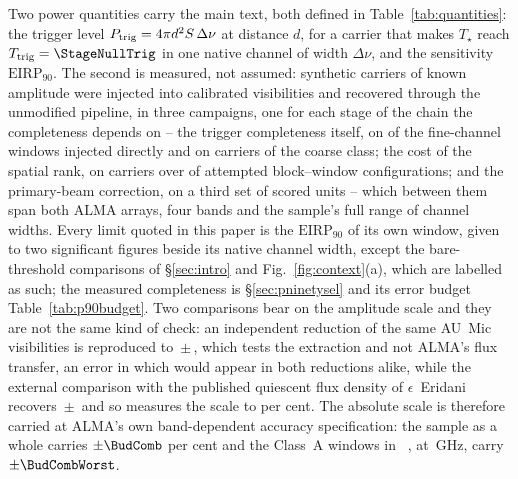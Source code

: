Two power quantities carry the main text, both defined in
Table~\ref{tab:quantities}: the trigger level $P_{\rm trig} = 4\pi
d^{2}S\,\Delta\nu$ at distance $d$, for a carrier that makes $T_\star$ reach
$T_{\rm trig}=\StageNullTrig$ in one native channel of width $\Delta\nu$, and
the sensitivity $\mathrm{EIRP}_{90}$. The second is measured, not assumed:
synthetic carriers of known amplitude were injected into calibrated
visibilities and recovered through the unmodified pipeline, in three campaigns,
one for each stage of the chain the completeness depends on -- the trigger
completeness itself, on \MkInjCompWin{} of the \MkInjCompDenom{} fine-channel
windows injected directly and on \SensNToneCoarse{} carriers of the coarse
class; the cost of the spatial rank, on \SelNTone{} carriers over
\MkInjSelUnit{} of \MkInjSelTotal{} attempted block--window configurations; and
the primary-beam correction, on a third set of \MkInjBeamUnit{} scored units --
which between them span both ALMA arrays, four bands and the sample's full
range of channel widths. Every limit quoted in this paper is the
$\mathrm{EIRP}_{90}$ of its own window, given to two significant figures beside
its native channel width, except the bare-threshold comparisons of
\S\ref{sec:intro} and Fig.~\ref{fig:context}(a), which are labelled as such;
the measured completeness is \S\ref{sec:pninetysel} and its error budget
Table~\ref{tab:p90budget}. Two comparisons bear on the amplitude scale and they
are not the same kind of check: an independent reduction of the same AU~Mic
visibilities is reproduced to \PxJanRatio\,$\pm$\,\PxJanRatioErr, which tests
the extraction and not ALMA's flux transfer, an error in which would appear in
both reductions alike, while the external comparison with the published
quiescent flux density of $\epsilon$~Eridani recovers
\PxEpsRatio\,$\pm$\,\PxEpsRatioErr{} \citep{Burton2022} and so measures the
scale to \SbEpsPct{} per cent. The absolute scale is therefore carried at
ALMA's own band-dependent accuracy specification: the sample as a whole carries
$\pm\BudComb$ per cent and the \BudNHiWin{} Class~A windows in
\BudHiBandWord~\BudHiBands, at \BudHiGHzList\,GHz, carry $\pm\BudCombWorst$.


